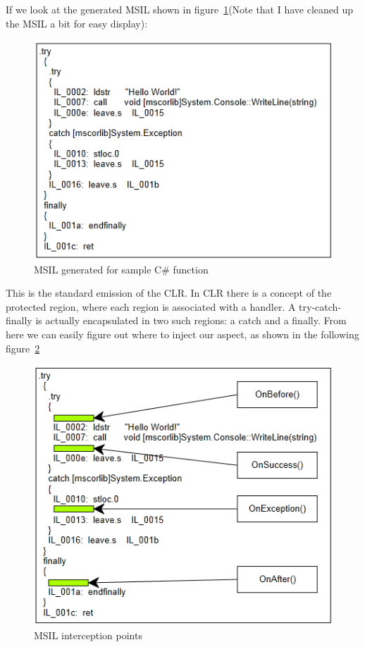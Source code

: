 If we look at the generated MSIL shown in figure~\ref{methodboundary01}(Note that I have cleaned up the MSIL a bit for easy display):

\begin{figure}[here]
  \includegraphics[scale=1.0]{MethodBoundaryOverviewB4.PNG}
  \centering
  \caption{MSIL generated for sample C\# function\label{methodboundary01}}
\end{figure}

This is the standard emission of the CLR. In CLR there is a concept of the protected region, where each region is associated with a handler. A try-catch-finally is actually encapsulated in two such regions: a catch and a finally. From here we can easily figure out where to inject our aspect, as shown in the following figure~\ref{methodboundary02}

\begin{figure}[here]
  \includegraphics[scale=1.0]{MethodBoundaryOverview.PNG}
  \centering
  \caption{MSIL interception points\label{methodboundary02}}
\end{figure}

